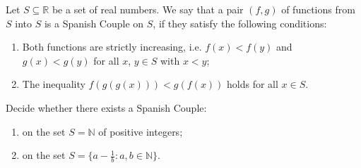 Let $S \subseteq \mathbb{R}$ be a set of real numbers. We say that a pair $(f, g)$ of functions from $S$ into $S$ is a Spanish Couple on $S$, if they satisfy the following conditions:

\begin{enumerate}[label = (\roman*)]
	\item Both functions are strictly increasing, i.e. $ f(x) < f(y)$ and $ g(x) < g(y)$ for all $ x$,  $ y\in S$ with $ x < y$;

	\item The inequality $ f(g(g(x))) < g(f(x))$ holds for all $x \in S$.
\end{enumerate}

Decide whether there exists a Spanish Couple:
\begin{enumerate}[label = (\alph*)]
	\item on the set $S = \mathbb{N}$ of positive integers;
	\item on the set $ S = \{a - \frac {1}{b}: a, b\in\mathbb{N}\}$.
\end{enumerate}
